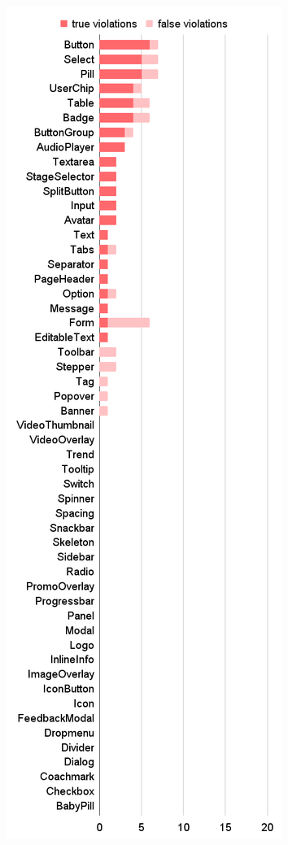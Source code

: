 \documentclass{master_thesis}
\begin{document}
\begin{figure}[H]
	\centering
	\begin{subfigure}{0.46\textwidth}
	\includegraphics[width=\textwidth]{img/audit/failed.png}

\end{subfigure}
\end{figure}
\end{document}
